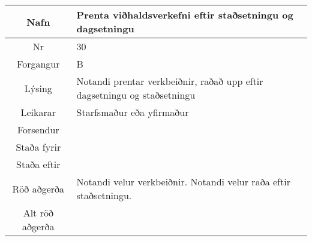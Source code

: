 \documentclass[a4paper]{article}
\begin{document}
\begin{tabular}{|c|p{10cm}|}
\hline
Nafn&Prenta viðhaldsverkefni eftir staðsetningu og dagsetningu\\
\hline
Nr&30\\
\hline
Forgangur&B\\
\hline
Lýsing&Notandi prentar verkbeiðnir, raðað upp eftir dagsetningu og staðsetningu\\
\hline
Leikarar&Starfsmaður eða yfirmaður\\
\hline
Forsendur&\\
\hline
Staða fyrir&\\
\hline
Staða eftir&\\
\hline
Röð aðgerða&Notandi velur verkbeiðnir. Notandi velur raða eftir staðsetningu.\\
\hline
Alt röð aðgerða&\\
\hline
\end{tabular}
\end{document}
